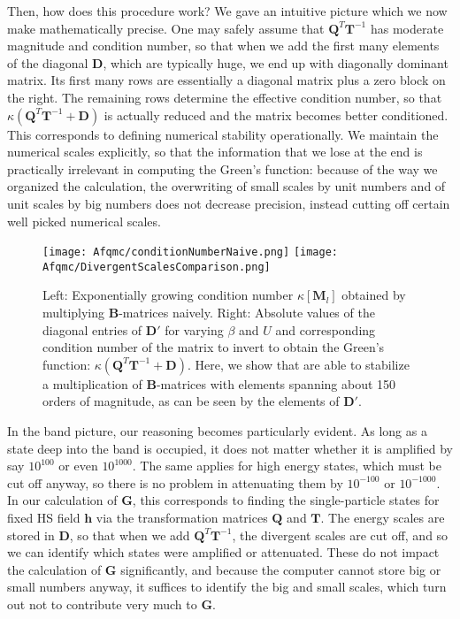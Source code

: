 Then, how does this procedure work?
We gave an intuitive picture which we now make mathematically precise.
One may safely assume that $\bm Q^T \bm T^{-1}$ has moderate magnitude and condition number, so that when we add the first many elements of the diagonal $\bm D$, which are typically huge, we end up with diagonally dominant matrix.
Its first many rows are essentially a diagonal matrix plus a zero block on the right.
The remaining rows determine the effective condition number, so that $\kappa ( \bm Q^T \bm T^{-1} + \bm D )$ is actually reduced and the matrix becomes better conditioned.
This corresponds to defining numerical stability operationally.
We maintain the numerical scales explicitly, so that the information that we lose at the end is practically irrelevant in computing the Green's function: because of the way we organized the calculation, the overwriting of small scales by unit numbers and of unit scales by big numbers does not decrease precision, instead cutting off certain well picked numerical scales.
\begin{figure}[H]\label{fig:divergences}
\texttt{[image: Afqmc/conditionNumberNaive.png]}
\hspace{-0.8cm}
\texttt{[image: Afqmc/DivergentScalesComparison.png]}
\caption[Condition number of $\bm M_l = \prod_l \bm B_l$ obtained by multiplying $\bm B$-matrices naively. Absolute values of the diagonal entries of $\bm D'$ and corresponding condition number of the matrix to invert to obtain the Green's function.]{Left: Exponentially growing condition number $\kappa [ \bm M_l ]$ obtained by multiplying $\bm B$-matrices naively.
Right: Absolute values of the diagonal entries of $\bm D'$ for varying $\beta$ and $U$ and corresponding condition number of the matrix to invert to obtain the Green's function: $\kappa ( \bm Q^T \bm T^{-1} + \bm D )$.
Here, we show that are able to stabilize a multiplication of $\bm B$-matrices with elements spanning about 150 orders of magnitude, as can be seen by the elements of $\bm D'$. }
\end{figure}

In the band picture, our reasoning becomes particularly evident.
As long as a state deep into the band is occupied, it does not matter whether it is amplified by say $10^{100}$ or even $10^{1000}$.
The same applies for high energy states, which must be cut off anyway, so there is no problem in attenuating them by $10^{-100}$ or $10^{-1000}$.
In our calculation of $\bm G$, this corresponds to finding the single-particle states for fixed HS field $\bm h$ via the transformation matrices $\bm Q$ and $\bm T$.
The energy scales are stored in $\bm D$, so that when we add $\bm Q^T \bm T^{-1}$, the divergent scales are cut off, and so we can identify which states were amplified or attenuated.
These do not impact the calculation of $\bm G$ significantly, and because the computer cannot store big or small numbers anyway, it suffices to identify the big and small scales, which turn out not to contribute very much to $\bm G$.

